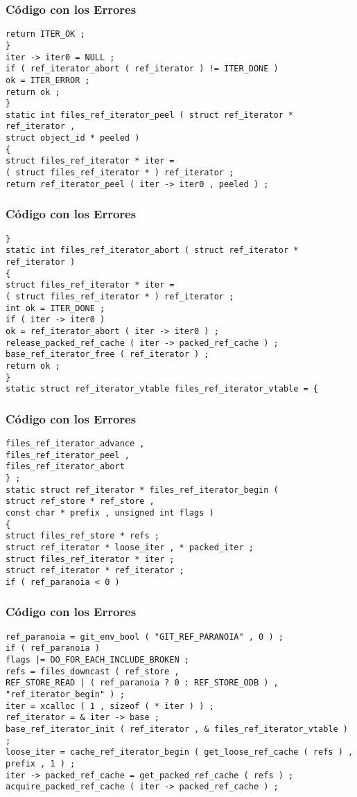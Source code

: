 \documentclass{beamer}
\begin{document}
\begin{frame}[fragile]
\frametitle{C\'odigo con los Errores}
\begin{verbatim}
return ITER_OK ; 
} 
iter -> iter0 = NULL ; 
if ( ref_iterator_abort ( ref_iterator ) != ITER_DONE ) 
ok = ITER_ERROR ; 
return ok ; 
} 
static int files_ref_iterator_peel ( struct ref_iterator * ref_iterator , 
struct object_id * peeled ) 
{ 
struct files_ref_iterator * iter = 
( struct files_ref_iterator * ) ref_iterator ; 
return ref_iterator_peel ( iter -> iter0 , peeled ) ; 
\end{verbatim}
\end{frame}
\begin{frame}[fragile]
\frametitle{C\'odigo con los Errores}
\begin{verbatim}
} 
static int files_ref_iterator_abort ( struct ref_iterator * ref_iterator ) 
{ 
struct files_ref_iterator * iter = 
( struct files_ref_iterator * ) ref_iterator ; 
int ok = ITER_DONE ; 
if ( iter -> iter0 ) 
ok = ref_iterator_abort ( iter -> iter0 ) ; 
release_packed_ref_cache ( iter -> packed_ref_cache ) ; 
base_ref_iterator_free ( ref_iterator ) ; 
return ok ; 
} 
static struct ref_iterator_vtable files_ref_iterator_vtable = { 
\end{verbatim}
\end{frame}
\begin{frame}[fragile]
\frametitle{C\'odigo con los Errores}
\begin{verbatim}
files_ref_iterator_advance , 
files_ref_iterator_peel , 
files_ref_iterator_abort 
} ; 
static struct ref_iterator * files_ref_iterator_begin ( 
struct ref_store * ref_store , 
const char * prefix , unsigned int flags ) 
{ 
struct files_ref_store * refs ; 
struct ref_iterator * loose_iter , * packed_iter ; 
struct files_ref_iterator * iter ; 
struct ref_iterator * ref_iterator ; 
if ( ref_paranoia < 0 ) 
\end{verbatim}
\end{frame}
\begin{frame}[fragile]
\frametitle{C\'odigo con los Errores}
\begin{verbatim}
ref_paranoia = git_env_bool ( "GIT_REF_PARANOIA" , 0 ) ; 
if ( ref_paranoia ) 
flags |= DO_FOR_EACH_INCLUDE_BROKEN ; 
refs = files_downcast ( ref_store , 
REF_STORE_READ | ( ref_paranoia ? 0 : REF_STORE_ODB ) , 
"ref_iterator_begin" ) ; 
iter = xcalloc ( 1 , sizeof ( * iter ) ) ; 
ref_iterator = & iter -> base ; 
base_ref_iterator_init ( ref_iterator , & files_ref_iterator_vtable ) ; 
loose_iter = cache_ref_iterator_begin ( get_loose_ref_cache ( refs ) , 
prefix , 1 ) ; 
iter -> packed_ref_cache = get_packed_ref_cache ( refs ) ; 
acquire_packed_ref_cache ( iter -> packed_ref_cache ) ; 
\end{verbatim}
\end{frame}
\end{document}
